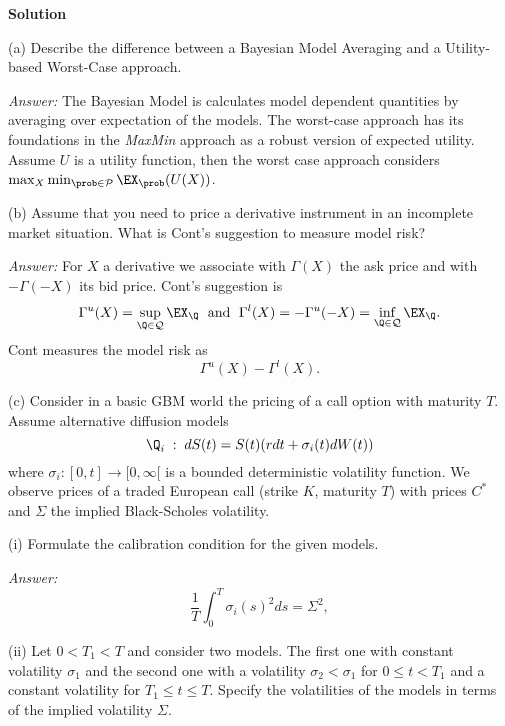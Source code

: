 \documentclass[11pt,a4paper,titlepage]{article}
\begin{document}







\item[]{\bf Solution}




\item[(a)]
Describe the difference between a Bayesian Model Averaging and a Utility-based Worst-Case
approach.

{\it Answer:} The Bayesian Model is calculates model dependent quantities by averaging over  expectation of the models. The worst-case approach has its foundations in the {\it MaxMin} approach as a robust version of expected utility. Assume $U$ is a utility function, then
the worst case approach considers
$\max _X \min_{\prob \in {\cal P}} \EX_{\prob}(U(X))$.

\item[(b)] Assume that you need to price a derivative instrument in an incomplete market situation. What is Cont's suggestion to measure model risk?

{\it Answer:}
For $X$ a derivative we associate with
$\Gamma(X)$ the ask price and with $-\Gamma(-X)$ its bid price.
Cont's suggestion is
$$
\Gamma^u(X)=\sup_{\Q \in {\cal Q}} \EX_{\Q} \; \mbox{ and } \;
\Gamma^l(X)= -\Gamma^u(-X)=\inf_{\Q \in {\cal Q}} \EX_{\Q}.
$$
Cont measures the model risk as
$$
\Gamma^u(X)-
\Gamma^l(X).
$$

\item[(c)]
Consider in a basic GBM world the pricing of a call option with maturity $T$.
Assume alternative diffusion models
\begin{equation}
\Q_i\;:\; dS(t) = S(t)(r dt + \sigma_i(t) dW(t))
\end{equation}
where $ \sigma_i: [0,t] \rightarrow [0, \infty[ $ is a bounded deterministic volatility function.
We observe prices of a traded European call (strike $K$, maturity $T$) with prices $C^*$ and
$\Sigma$ the implied Black-Scholes volatility.




\item[(i)]
Formulate the calibration condition for the given models.

{\it Answer:}
\begin{equation}
\frac{1}{T} \int_0^T  \sigma_i(s)^2 ds = \Sigma^2,
\end{equation}
\item[(ii)]
Let $0< T_1 <T$ and consider two models. The first one with constant volatility $\sigma_1$ and the second one with a volatility $\sigma_2 < \sigma _1$ for $0 \leq t <T_1$ and a constant volatility for $T_1\leq t \leq T$. Specify  the  volatilities of the models in terms of the implied volatility $\Sigma $.
\end{document}
